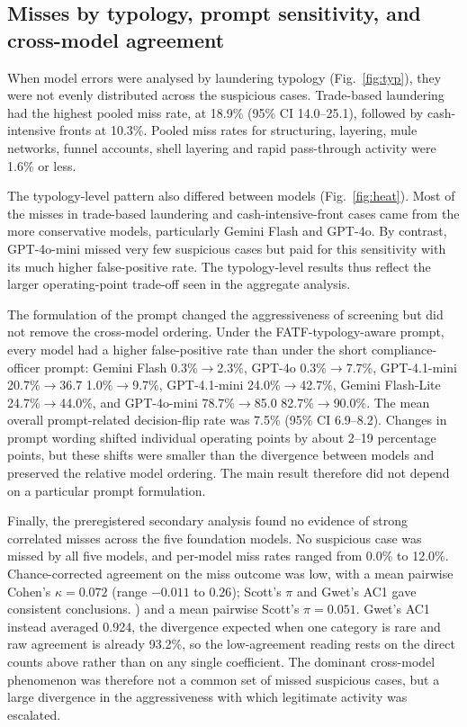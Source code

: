 \documentclass[pdflatex,sn-basic,Numbered]{sn-jnl}
\newcommand{\HLtext}[1]{\texthl{#1}}
\newcommand{\HLdel}[1]{\textcolor{HLink}{\sout{#1}}}
\renewcommand{\HLtext}[1]{#1}\renewcommand{\HLdel}[1]{#1}%
\begin{document}
\subsection{Misses by typology, prompt sensitivity, and cross-model agreement}\label{sec:typology}

When model errors were analysed by laundering typology (Fig.~\ref{fig:typ}), they were not evenly distributed across the suspicious cases. Trade-based laundering had the highest pooled miss rate, at 18.9\% (95\% CI 14.0--25.1), followed by cash-intensive fronts at 10.3\%. Pooled miss rates for structuring, layering, mule networks, funnel accounts, shell layering and rapid pass-through activity were 1.6\% or less.

The typology-level pattern also differed between models (Fig.~\ref{fig:heat}). Most of the misses in trade-based laundering and cash-intensive-front cases came from the more conservative models, particularly Gemini Flash and GPT-4o. By contrast, GPT-4o-mini missed very few suspicious cases but paid for this sensitivity with its much higher false-positive rate. The typology-level results thus reflect the larger operating-point trade-off seen in the aggregate analysis.

The formulation of the prompt changed the aggressiveness of screening but did not remove the cross-model ordering. Under the FATF-typology-aware prompt, every model had a higher false-positive rate than under the short compliance-officer prompt: Gemini Flash 0.3\%$\rightarrow$2.3\%, GPT-4o \HLdel{0.3\%$\rightarrow$7.7\%, GPT-4.1-mini 20.7\%$\rightarrow$36.7} \HLtext{1.0}\%$\rightarrow$\HLtext{9.7}\%\HLtext{, GPT-4.1-mini 24.0}\%$\rightarrow$\HLtext{42.7}\%, Gemini Flash-Lite 24.7\%$\rightarrow$44.0\%, and GPT-4o-mini \HLdel{78.7\%$\rightarrow$85.0} \HLtext{82.7}\%$\rightarrow$\HLtext{90.0}\%. The mean overall prompt-related decision-flip rate was 7.5\% (95\% CI 6.9--8.2). Changes in prompt wording shifted individual operating points by about 2--19 percentage points, but these shifts were smaller than the divergence between models and preserved the relative model ordering. The main result therefore did not depend on a particular prompt formulation.

Finally, the preregistered secondary analysis found no evidence of strong correlated misses across the five foundation models. No suspicious case was missed by all five models, and per-model miss rates ranged from 0.0\% to 12.0\%. Chance-corrected agreement on the miss outcome was low, with a mean pairwise Cohen's $\kappa = 0.072$ (range $-0.011$ to $0.26$\HLdel{); Scott's $\pi$ and Gwet's AC1 gave consistent conclusions.} \HLtext{) and a mean pairwise Scott's} $\pi = 0.051$\HLtext{. Gwet's AC1 instead averaged 0.924, the divergence expected when one category is rare and raw agreement is already 93.2}\%\HLtext{, so the low-agreement reading rests on the direct counts above rather than on any single coefficient.} The dominant cross-model phenomenon was therefore not a common set of missed suspicious cases, but a large divergence in the aggressiveness with which legitimate activity was escalated.
\end{document}
